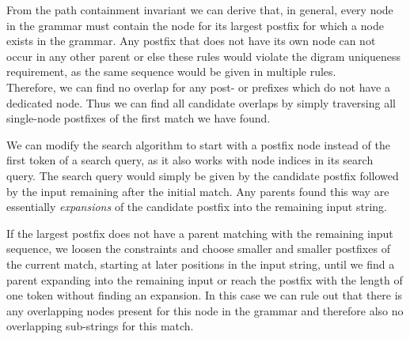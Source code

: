 \noindent
From the path containment invariant we can derive that, in general, every node in the grammar must contain the node for its largest postfix for which a node exists in the grammar. Any postfix that does not have its own node can not occur in any other parent or else these rules would violate the digram uniqueness requirement, as the same sequence would be given in multiple rules.\\
Therefore, we can find no overlap for any post- or prefixes which do not have a dedicated node. Thus we can find all candidate overlaps by simply traversing all single-node postfixes of the first match we have found.\par

\noindent
We can modify the search algorithm to start with a postfix node instead of the first token of a search query, as it also works with node indices in its search query. The search query would simply be given by the candidate postfix followed by the input remaining after the initial match. Any parents found this way are essentially \textit{expansions} of the candidate postfix into the remaining input string.\par

\noindent
If the largest postfix does not have a parent matching with the remaining input sequence, we loosen the constraints and choose smaller and smaller postfixes of the current match, starting at later positions in the input string, until we find a parent expanding into the remaining input or reach the postfix with the length of one token without finding an expansion. In this case we can rule out that there is any overlapping nodes present for this node in the grammar and therefore also no overlapping sub-strings for this match.\par

